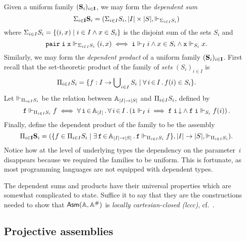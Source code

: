 Given a uniform family $(\mathbf{S}_i)_{i \in \mathbf{I}}$, we may form the
\emph{dependent sum}
%
\begin{equation*}
  \Sigma_{i \in \mathbf{I}} \mathbf{S}_i =
  (\Sigma_{i \in I} S_i, |I| \times |S|, \Vdash_{\Sigma_{i \in I} S_i})
\end{equation*}
%
where $\Sigma_{i \in I} S_i = \{(i,x) \mid i \in I \land x \in
  S_i\}$ is the disjoint sum of the sets $S_i$ and
%
\begin{equation*}
  \mathtt{pair}\;\mathtt{i}\;\mathtt{x} \Vdash_{\Sigma_{i \in I} S_i} (i, x)
  \iff
  \mathtt{i} \Vdash_I i
  \land
  x \in S_i
  \land
  \mathtt{x} \Vdash_{S_i} x.  
\end{equation*}
%
Similarly, we may form the \emph{dependent product} of a uniform
family $(\mathbf{S}_i)_{i \in \mathbf{I}}$. First recall that the
set-theoretic product of the family of \emph{sets} $(S_i)_{i \in I}$
is
%
\begin{equation*}
  \Pi_{i \in I} S_i =
  \{f : I \to \bigcup\nolimits_{i \in I} S_i \mid
    \forall\, i \,{\in}\, I\,.\,f(i) \in S_i
  \}.
\end{equation*}
%
Let $\Vdash_{\Pi_{i \in I} S_i}$ be the relation between $\mathbb{A}_{|I|
  \to |S|}$ and $\Pi_{i \in I} S_i$, defined by
%
\begin{equation*}
  \mathtt{f} \Vdash_{\Pi_{i \in I} S_i} f
  \iff
  \forall\, \mathtt{i} \,{\in}\, \mathbb{A}_{|I|}\,.\,
    \forall\, i \,{\in}\, I\,.\left(
      \mathtt{i} \Vdash_I i
      \implies
      \mathtt{f}\;\mathtt{i}\,{\downarrow} \land
      \mathtt{f}\;\mathtt{i} \Vdash_{S_i} f(i)
    \right)
 .
\end{equation*}
%
Finally, define the dependent product of the family to be the assembly
%
\begin{equation*}
  \Pi_{i \in \mathbf{I}} \mathbf{S}_i =
  (\{f \in \Pi_{i \in I} S_i \mid
    \exists\, \mathtt{f} \,{\in}\, \mathbb{A}_{|I| \to |S|}\,.\,\mathtt{f} \Vdash_{\Pi_{i \in I} S_i}
      f\},
  |I| \to |S|, {\Vdash_{\Pi_{i \in I} S_i}}).
\end{equation*}
%
Notice how at the level of underlying types the dependency on the
parameter~$i$ disappears because we required the families to be
uniform. This is fortunate, as most programming languages are not
equipped with dependent types.

The dependent sums and products have their universal properties which
are somewhat complicated to state. Suffice it to say that they are the
constructions needed to show that $\mathsf{Asm}(\mathbb{A},\mathbb{A}^{\#})$ is \emph{locally
  cartesian-closed (lccc)}, cf.\ \cite{background-lccc}.


\subsection{Projective assemblies}
\label{sec:projective-assemblies}


